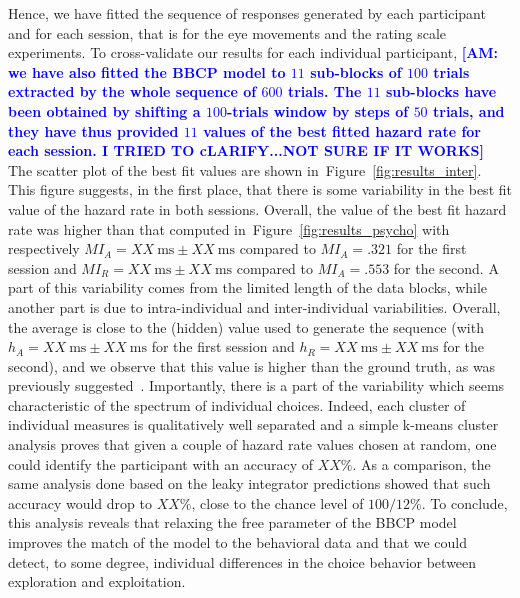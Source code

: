 \documentclass[12pt,english]{article}%
\newcommand{\ms}{\si{\milli\second}}%
\newcommand{\citep}[1]{\parencite{#1}}
\newcommand{\seeFig}[1]{Figure~\ref{fig:#1}}
\newcommand{\AM}[1]{\textbf{\textcolor{blue}{[AM: #1]}}}
\begin{document}
Hence, we have fitted the sequence of responses generated by each participant and
for each session, that is for the eye movements and the rating scale experiments.
To cross-validate our results for each individual participant, 
\AM{we have also fitted the BBCP model to $11$ sub-blocks of $100$ trials extracted by the whole sequence of $600$ trials. The $11$ sub-blocks have been obtained by shifting a $100$-trials window by steps of $50$ trials, and they have thus provided $11$ values of the best fitted hazard rate for each session. I TRIED TO cLARIFY...NOT SURE IF IT WORKS}
The scatter plot of the best fit values are shown in~\seeFig{results_inter}.
This figure suggests, in the first place, that there is some variability 
in the best fit value of the hazard rate in both sessions.
Overall, the value of the best fit hazard rate  
was higher than that computed in~\seeFig{results_psycho}
with respectively $MI_A = XX~\ms \pm XX~\ms$ compared to $MI_A = .321$ for the first session and
$MI_R = XX~\ms \pm XX~\ms$ compared to $MI_A = .553$ for the second.
A part of this variability comes from the limited length of the data blocks,
while another part is due to intra-individual and inter-individual variabilities.
Overall, the average is close to the (hidden) value used to generate the sequence
(with $h_A = XX~\ms \pm XX~\ms$ for the first session and
$h_R = XX~\ms \pm XX~\ms$ for the second),
and we observe that this value is higher than the ground truth, 
as was previously suggested~\citep{Meyniel??}.
Importantly, there is a part of the variability 
which seems characteristic of the spectrum of individual choices.
Indeed, each cluster of individual measures is qualitatively well separated and
a simple k-means cluster analysis proves that 
given a couple of hazard rate values chosen at random,
one could identify the participant with an accuracy of $XX\%$.
As a comparison, the same analysis done based on the leaky integrator predictions
showed that such accuracy would drop to $XX\%$, 
close to the chance level of $100/12\%$.
To conclude, this analysis reveals 
that relaxing the free parameter of the BBCP model
improves the match of the model to the behavioral data and 
that we could detect, to some degree, individual differences in the choice behavior
between exploration and exploitation.
\end{document}
